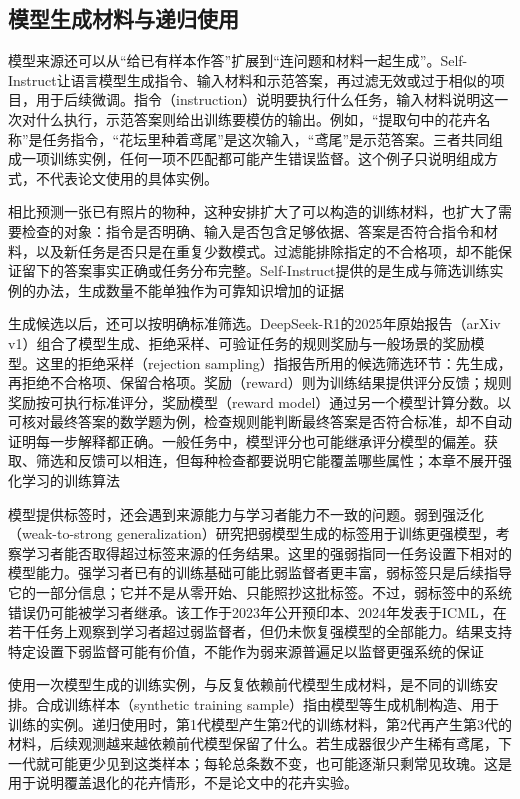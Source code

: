 \subsection{模型生成材料与递归使用}
\label{sec:knowledge-acquisition-history-generated-material}

模型来源还可以从“给已有样本作答”扩展到“连问题和材料一起生成”。Self-Instruct让语言模型生成指令、输入材料和示范答案，再过滤无效或过于相似的项目，用于后续微调。指令（instruction）说明要执行什么任务，输入材料说明这一次对什么执行，示范答案则给出训练要模仿的输出。例如，“提取句中的花卉名称”是任务指令，“花坛里种着鸢尾”是这次输入，“鸢尾”是示范答案。三者共同组成一项训练实例，任何一项不匹配都可能产生错误监督。这个例子只说明组成方式，不代表论文使用的具体实例。

相比预测一张已有照片的物种，这种安排扩大了可以构造的训练材料，也扩大了需要检查的对象：指令是否明确、输入是否包含足够依据、答案是否符合指令和材料，以及新任务是否只是在重复少数模式。过滤能排除指定的不合格项，却不能保证留下的答案事实正确或任务分布完整。Self-Instruct提供的是生成与筛选训练实例的办法，生成数量不能单独作为可靠知识增加的证据

生成候选以后，还可以按明确标准筛选。DeepSeek-R1的2025年原始报告（arXiv v1）组合了模型生成、拒绝采样、可验证任务的规则奖励与一般场景的奖励模型。这里的拒绝采样（rejection sampling）指报告所用的候选筛选环节：先生成，再拒绝不合格项、保留合格项。奖励（reward）则为训练结果提供评分反馈；规则奖励按可执行标准评分，奖励模型（reward model）通过另一个模型计算分数。以可核对最终答案的数学题为例，检查规则能判断最终答案是否符合标准，却不自动证明每一步解释都正确。一般任务中，模型评分也可能继承评分模型的偏差。获取、筛选和反馈可以相连，但每种检查都要说明它能覆盖哪些属性；本章不展开强化学习的训练算法

模型提供标签时，还会遇到来源能力与学习者能力不一致的问题。弱到强泛化（weak-to-strong generalization）研究把弱模型生成的标签用于训练更强模型，考察学习者能否取得超过标签来源的任务结果。这里的强弱指同一任务设置下相对的模型能力。强学习者已有的训练基础可能比弱监督者更丰富，弱标签只是后续指导它的一部分信息；它并不是从零开始、只能照抄这批标签。不过，弱标签中的系统错误仍可能被学习者继承。该工作于2023年公开预印本、2024年发表于ICML，在若干任务上观察到学习者超过弱监督者，但仍未恢复强模型的全部能力。结果支持特定设置下弱监督可能有价值，不能作为弱来源普遍足以监督更强系统的保证

使用一次模型生成的训练实例，与反复依赖前代模型生成材料，是不同的训练安排。合成训练样本（synthetic training sample）指由模型等生成机制构造、用于训练的实例。递归使用时，第1代模型产生第2代的训练材料，第2代再产生第3代的材料，后续观测越来越依赖前代模型保留了什么。若生成器很少产生稀有鸢尾，下一代就可能更少见到这类样本；每轮总条数不变，也可能逐渐只剩常见玫瑰。这是用于说明覆盖退化的花卉情形，不是论文中的花卉实验。

